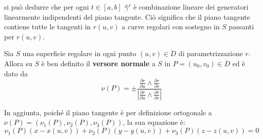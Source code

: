 si può dedurre che per ogni $t \in [a,b]$ $\Tilde{\gamma}'$ è combinazione lineare dei generatori linearmente indipendenti del piano tangente. Ciò significa che il piano tangente contiene tutte le tangenti in $r(u,v)$ a curve regolari con sostegno in $S$ passanti per $r(u,v)$.
\begin{definition} \label{Def: Versore normale a una superficie}
    Sia $S$ una superficie regolare in ogni punto $(u,v)\in \mathring{D}$ di parametrizzazione $r$. Allora su $S$ è ben definito il \textbf{versore normale} a $S$ in $P=(u_0,v_0) \in \mathring{D}$ ed è dato da
    \begin{equation}
        \nu(P)= \pm \frac{\frac{\partial r}{\partial u} \wedge \frac{\partial r}{\partial v}}{\left|\frac{\partial r}{\partial u} \wedge \frac{\partial r}{\partial v}\right|}
    \end{equation}
\end{definition}
    In aggiunta, poiché il piano tangente è per definizione ortogonale a $\nu(P)=(\nu_1(P), \nu_2(P), \nu_3(P))$, la sua equazione è:
    \begin{equation} \label{Eq: Equazione piano tangente a una superficie}
        \nu_1(P)(x-x(u,v))+ \nu_2(P)(y-y(u,v))+\nu_3(P)(z-z(u,v))=0
    \end{equation}
